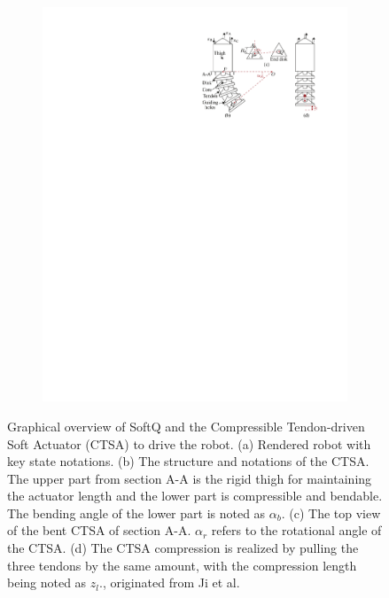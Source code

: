 \begin{figure}[htb]
\begin{subfigure}[b]{0.59\textwidth}
    \includegraphics[width=\linewidth]{img/chap3/legs.pdf}
    \end{subfigure}
    \caption{Graphical overview of SoftQ and the Compressible Tendon-driven Soft Actuator (CTSA) to drive the robot. (a) Rendered robot with key state notations. (b) The structure and notations of the CTSA. The upper part from section A-A is the rigid thigh for maintaining the actuator length and the lower part is compressible and bendable. The bending angle of the lower part is noted as $\alpha_b$. (c) The top view of the bent CTSA of section A-A. $\alpha_r$ refers to the rotational angle of the CTSA. (d) The CTSA compression is realized by pulling the three tendons by the same amount, with the compression length being noted as $z_l$., originated from Ji et al.\cite{jiSynthesizingOptimalGait2022, jiOmnidirectionalWalkingQuadruped2022}}
    \label{fig:robot}
\end{figure}